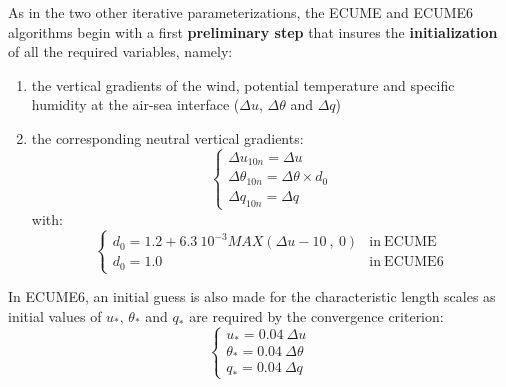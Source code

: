 As in the two other iterative parameterizations, the ECUME and ECUME6 algorithms begin with a first \textbf{preliminary step} that insures the \textbf{initialization} 
of all the required variables, namely:
\begin{enumerate}
	\item the vertical gradients of the wind, potential temperature and specific humidity at the air-sea interface 
($\Delta u$, $\Delta \theta$ and $\Delta q$)
	\item the corresponding neutral vertical gradients:
$$
\left\{
\begin{array}{l}
	\Delta u_{10n}=\Delta u\\
	\Delta {\theta}_{10n}=\Delta \theta \times d_0\\
	\Delta q_{10n}=\Delta q
\end{array}
\right.
$$
with:
$$
\left\{
\begin{array}{ll}
	d_0=1.2+6.3~10^{-3}\mathit{MAX}(\Delta u-10~,~0) & \mathrm{in~ECUME}\\
	d_0=1.0 & \mathrm{in~ECUME6}
\end{array}
\right.
$$
\end{enumerate}
In ECUME6, an initial guess is also made for the characteristic length scales as initial values of 
$u_*$, ${\theta}_*$ and $q_*$ are required by the convergence criterion:
$$
\left\{
\begin{array}{l}
	u_*=0.04~\Delta u\\
	{\theta}_*=0.04~\Delta \theta\\
	q_*=0.04~\Delta q
\end{array}
\right.
$$

\vspace*{0.2 cm}

